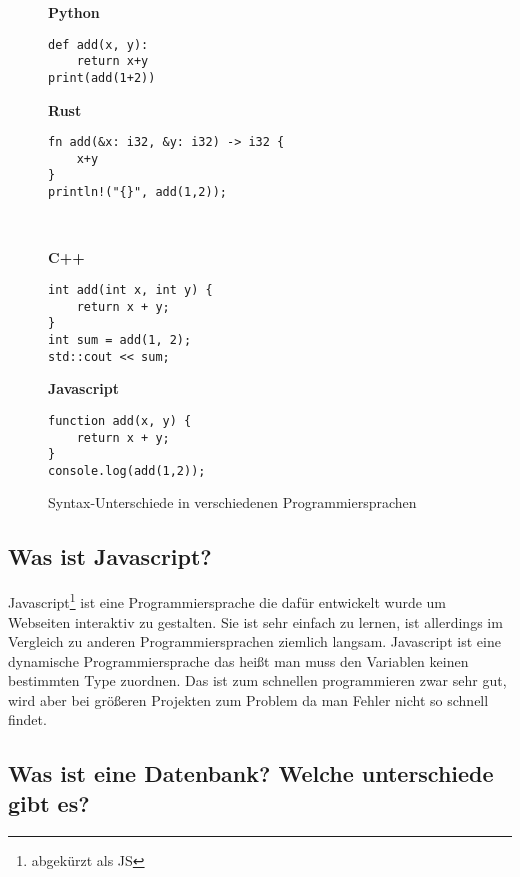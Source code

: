 \documentclass[a4paper, ngerman, 11pt]{scrartcl}
\begin{document}
\begin{figure}[ht]
\begin{minipage}{0.42\textwidth}
\textbf{Python}
\begin{verbatim}
def add(x, y):
    return x+y
print(add(1+2))
\end{verbatim}

\end{minipage}
\begin{minipage}{0.57\textwidth}
\textbf{Rust}
\begin{verbatim}
fn add(&x: i32, &y: i32) -> i32 {
    x+y
}
println!("{}", add(1,2));
\end{verbatim}
\end{minipage}\\[5mm]
\begin{minipage}{0.42\textwidth}

\textbf{C++}
\begin{verbatim}
int add(int x, int y) {
    return x + y;
}
int sum = add(1, 2);
std::cout << sum;
\end{verbatim}
\end{minipage}
\begin{minipage}{0.5\textwidth}
\textbf{Javascript}
\begin{verbatim}
function add(x, y) {
    return x + y;
}
console.log(add(1,2));
\end{verbatim}
\end{minipage}

\caption{Syntax-Unterschiede in verschiedenen Programmiersprachen\label{abb:syntax}}
\end{figure}

\subsection{Was ist Javascript?}

Javascript\footnote{abgekürzt als JS} ist eine Programmiersprache die dafür entwickelt wurde um Webseiten interaktiv zu gestalten.
Sie ist sehr einfach zu lernen, ist allerdings im Vergleich zu anderen Programmiersprachen ziemlich langsam.
Javascript ist eine dynamische Programmiersprache das heißt man muss den Variablen keinen bestimmten Type zuordnen.
Das ist zum schnellen programmieren zwar sehr gut, wird aber bei größeren Projekten zum Problem da man Fehler nicht so schnell findet.

\subsection[Wo ist Datenbank? (Sql vs NoSql)]{Was ist eine Datenbank? Welche unterschiede gibt es?}
\end{document}
